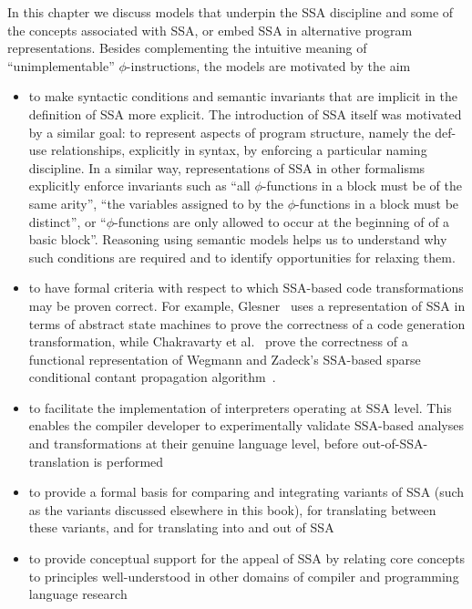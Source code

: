 \label{section:Part1:Semantics:Intro}
In this chapter we discuss models that underpin the SSA discipline and
some of the concepts associated with SSA, or embed SSA in alternative
program representations. Besides complementing the intuitive meaning
of ``unimplementable'' $\phi$-instructions, the models are motivated
by the aim
\begin{itemize}
\item to make syntactic conditions and semantic invariants that are
  implicit in the definition of SSA more explicit. The introduction of
  SSA itself was motivated by a similar goal: to represent aspects of
  program structure, namely the def-use relationships, explicitly in
  syntax, by enforcing a particular naming discipline. In a similar
  way, representations of SSA in other formalisms explicitly enforce
  invariants such as ``all $\phi$-functions in a block must be of the
  same arity'', ``the variables assigned to by the $\phi$-functions in
  a block must be distinct'', or ``$\phi$-functions are only allowed
  to occur at the beginning of of a basic block''. Reasoning using
  semantic models helps us to understand why such conditions are
  required and to identify opportunities for relaxing them.
\item to have formal criteria with respect to which SSA-based code
  transformations may be proven correct. For example,
  Glesner~\cite{DBLP:conf/asm/Glesner04} uses a representation of SSA
  in terms of abstract state machines to prove the correctness of a
  code generation transformation, while Chakravarty et
  al.~\cite{ChakravartyKZ:COCV03} prove the correctness of a
  functional representation of Wegmann and Zadeck's SSA-based sparse
  conditional contant propagation
  algorithm~\cite{WegmannZ:Toplas1991}.
\item to facilitate the implementation of interpreters operating at
  SSA level. This enables the compiler developer to experimentally
  validate SSA-based analyses and transformations at their genuine
  language level, before out-of-SSA-translation is performed
\item to provide a formal basis for comparing and integrating variants
  of SSA (such as the variants discussed elsewhere in this book), for
  translating between these variants, and for translating into and out
  of SSA
\item to provide conceptual support for the appeal of SSA by relating
  core concepts to principles well-understood in other domains of
  compiler and programming language research
\end{itemize}

